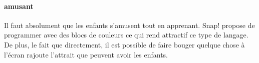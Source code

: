 \paragraph{amusant} Il faut absolument que les enfants s'amusent tout en apprenant. Snap! propose de programmer avec des blocs de couleurs ce qui rend attractif ce type de langage. De plus, le fait que directement, il est possible de faire bouger quelque chose à l'écran rajoute l'attrait que peuvent avoir les enfants.

